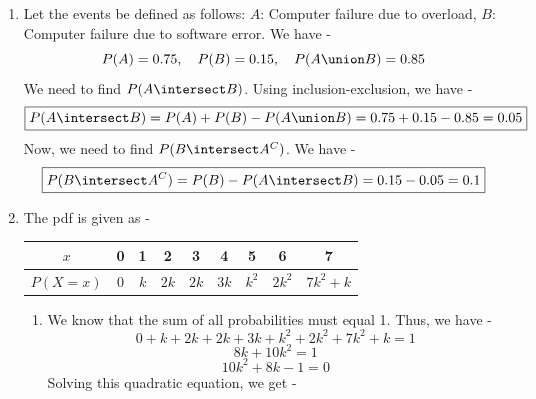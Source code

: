 \begin{enumerate}
\begin{enumerate}
        \[\boxed{P(\text{2 or more boys}) = \sum_{i=2}^{\infty} \left(1 - \left(\frac{1}{2}\right)^i - i\left(\frac{1}{2}\right)^i\right) \cdot kp^i
        }\]
        Let $n \to \infty$. We have -
        \[P(\text{2 or more boys}) = \sum_{i=2}^{\infty} \left(1 - \left(\frac{1}{2}\right)^i - i\left(\frac{1}{2}\right)^i\right) \cdot kp^i\]
        We can calculate this as follows -
        \[\boxed{P(\text{2 or more boys}) = k \left(\frac{p}{1-p} - \frac{p/2}{1 - p/2} - \frac{(p/2)^2}{(1 - p/2)^2}\right) = k \left(\frac{p}{1-p} - \frac{p}{2-p} - \frac{p^2}{(2-p)^2}\right)
        }\]
        Therefore, the probability that if a family has at least one boy, what is the probability that the family has two or more boys is -
        \[\boxed{\frac{(1 - p) \left(\frac{p}{1-p} - \frac{p}{2-p} - \frac{p^2}{(2-p)^2}\right)}{\frac{p}{2-p}} = \frac{(2-p) - (1-p) - \frac{p(1-p)}{2-p}}{(2-p)} = \frac{1 - \frac{p(1-p)}{2-p}}{(2-p)} = 1 - \frac{p(1-p)}{(2-p)^2}
        }\]
    \end{enumerate}
    \item Let the events be defined as follows:
    $A$: Computer failure due to overload, $B$: Computer failure due to software error. We have -
    $$P(A) = 0.75, \quad P(B) = 0.15, \quad P(A \union B) = 0.85$$
    We need to find $P(A \intersect B)$. Using inclusion-exclusion, we have -
    \[\boxed{P(A \intersect B) = P(A) + P(B) - P(A \union B) = 0.75 + 0.15 - 0.85 = 0.05
    }\]
    Now, we need to find $P(B \intersect A^C)$. We have -
    \[\boxed{P(B \intersect A^C) = P(B) - P(A \intersect B) = 0.15 - 0.05 = 0.1
    }\]
    \item The pdf is given as - \\ 
    \begin{center}
    \begin{tabular}{|c|c|c|c|c|c|c|c|c|}
        \hline
        $x$ & 0 & 1 & 2 & 3 & 4 & 5 & 6 & 7 \\
        \hline
        $P(X=x)$ & 0 & $k$ & $2k$ & $2k$ & $3k$ & $k^2$ & $2k^2$ & $7k^2 +k$
        \\
        \hline
    \end{tabular}
    \end{center}
    \begin{enumerate}
        \item We know that the sum of all probabilities must equal 1. Thus, we have -
            \[0 + k + 2k + 2k + 3k + k^2 + 2k^2 + 7k^2 + k = 1\]
            \[8k + 10k^2 = 1\]
            \[10k^2 + 8k - 1 = 0\]
            Solving this quadratic equation, we get -

\end{enumerate}
\end{enumerate}
